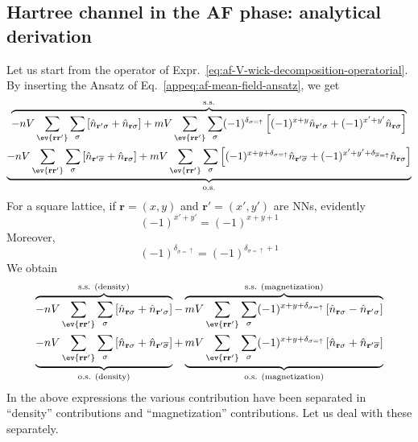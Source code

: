 \subsection{Hartree channel in the AF phase: analytical derivation}\label{subsec:af-hartree-analytical}

Let us start from the operator of Expr.~\eqref{eq:af-V-wick-decomposition-operatorial}. By inserting the Ansatz of Eq.~\eqref{appeq:af-mean-field-ansatz}, we get
\begin{multline*}
	\overbrace{
		-nV \sum_{\ev{\mathbf{r}\mathbf{r}'}} \sum_\sigma \left[
		\hat n_{\mathbf{r}'\sigma} + \hat n_{\mathbf{r}\sigma}
		\right] + mV \sum_{\ev{\mathbf{r}\mathbf{r}'}} \sum_\sigma (-1)^{\delta_{\sigma=\uparrow}} \left[
		(-1)^{x+y} \hat n_{\mathbf{r}'\sigma} + (-1)^{x'+y'} \hat n_{\mathbf{r}\sigma}
		\right]
	}^{\mathrm{s.s.}} \\
	\underbrace{
		-nV \sum_{\ev{\mathbf{r}\mathbf{r}'}} \sum_\sigma \left[
		\hat n_{\mathbf{r}'\overline{\sigma}} + \hat n_{\mathbf{r}\sigma}
		\right] + mV \sum_{\ev{\mathbf{r}\mathbf{r}'}} \sum_\sigma \left[
		(-1)^{x+y+\delta_{\sigma=\uparrow}} \hat n_{\mathbf{r}'\overline{\sigma}} + (-1)^{x'+y'+\delta_{\overline{\sigma}=\uparrow}} \hat n_{\mathbf{r}\sigma}
		\right]
	}_{\mathrm{o.s.}}
\end{multline*}
For a square lattice, if $\mathbf{r} = (x,y)$ and $\mathbf{r}' = (x',y')$ are NNs, evidently
\[
	(-1)^{x'+y'} = (-1)^{x+y+1}
\]
Moreover,
\[
	(-1)^{\delta_{\overline{\sigma}=\uparrow}} = (-1)^{\delta_{\sigma=\uparrow}+1}
\]
We obtain
\begin{multline}
	\overbrace{
		-nV \sum_{\ev{\mathbf{r}\mathbf{r}'}} \sum_\sigma \left[
		\hat n_{\mathbf{r}\sigma} + \hat n_{\mathbf{r}'\sigma}
		\right]
	}^{\text{s.s. (density)}} - \overbrace{
		mV \sum_{\ev{\mathbf{r}\mathbf{r}'}} \sum_\sigma (-1)^{x+y+\delta_{\sigma=\uparrow}} \left[
		\hat n_{\mathbf{r}\sigma} - \hat n_{\mathbf{r}'\sigma}
		\right]
	}^{\text{s.s. (magnetization)}} \\
	\underbrace{
		-nV \sum_{\ev{\mathbf{r}\mathbf{r}'}} \sum_\sigma \left[
		\hat n_{\mathbf{r}\sigma} + \hat n_{\mathbf{r}'\overline{\sigma}}
		\right]
	}_{\text{o.s. (density)}} + \underbrace{
		mV \sum_{\ev{\mathbf{r}\mathbf{r}'}} \sum_\sigma (-1)^{x+y+\delta_{\sigma=\uparrow}} \left[
		\hat n_{\mathbf{r}\sigma} + \hat n_{\mathbf{r}'\overline{\sigma}}
		\right]
	}_{\text{o.s. (magnetization)}}
	\label{eq:af-hartree-renormalization-intermediate}
\end{multline}
In the above expressions the various contribution have been separated in ``density'' contributions and ``magnetization'' contributions. Let us deal with these separately.

